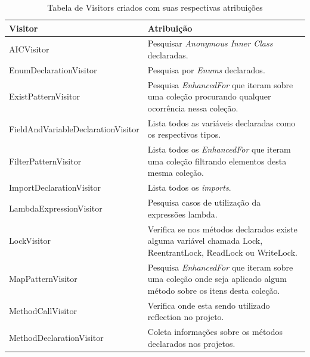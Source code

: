 \begin{table}[ht!] \footnotesize
	\centering
	\caption{Tabela de Visitors criados com suas respectivas atribuições}
	\label{tab:VisitorsCriados}	
    \begin{tabular}{ >{\arraybackslash}p{2.2in} | >{\arraybackslash}m{3.8in} }
			\hline 
			\textbf{Visitor} & \textbf{Atribuição}\\ \hline \hline
			
			AICVisitor & Pesquisar \textit{Anonymous Inner Class} declaradas.\\ \hline
			
			EnumDeclarationVisitor 	& Pesquisa por \textit{Enums} declarados.\\ \hline
			
			ExistPatternVisitor	& Pesquisa \textit{EnhancedFor} que iteram sobre uma coleção procurando qualquer ocorrência nessa coleção.\\ \hline
			
			FieldAndVariableDeclarationVisitor & Lista todos as variáveis declaradas como os respectivos tipos.\\ \hline
			
			FilterPatternVisitor &  Lista todos os \textit{EnhancedFor} que iteram uma coleção filtrando elementos desta mesma coleção.\\ \hline
			
			ImportDeclarationVisitor & Lista todos os \textit{imports}.\\ \hline
			
			LambdaExpressionVisitor & Pesquisa casos de utilização da expressões lambda. \\ \hline
			
			LockVisitor & Verifica se nos métodos declarados existe alguma variável chamada Lock, ReentrantLock, ReadLock ou WriteLock. \\ \hline
			
			MapPatternVisitor & Pesquisa \textit{EnhancedFor} que iteram sobre uma coleção onde seja aplicado algum método sobre os itens desta coleção. \\ \hline
			
			MethodCallVisitor & Verifica onde esta sendo utilizado reflection no projeto.\\ \hline
			
			MethodDeclarationVisitor & Coleta informações sobre os métodos declarados nos projetos. \\ \hline
			

\end{tabular}
\end{table}
